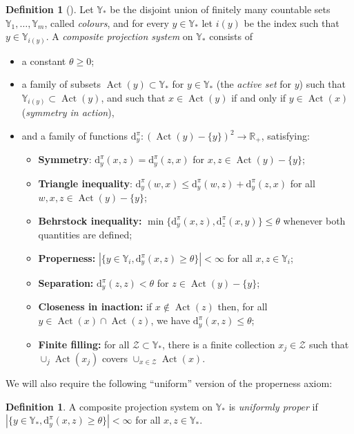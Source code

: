 \documentclass[svgnames]{amsart}
\theoremstyle{plain}
\theoremstyle{definition}
\newtheorem{defn}[thm]{Definition}
\newcommand{\R}{\mathbb{R}}
\newcommand{\dist}{\mathrm{d}}
\newcommand{\Act}{\operatorname{Act}}
\begin{document}
\begin{defn}[{\cite[Definition 1.2]{dahmani:rotating}}]\label{def;CPS}
Let $\mathbb{Y}_*$ be the disjoint union of finitely many countable sets $\mathbb{Y}_1, \dots, \mathbb{Y}_m$, called \emph{colours}, and for every $y\in \mathbb{Y}_*$ let $i(y)$ be the index such that $y\in \mathbb{Y}_{i(y)}$. A \emph{composite projection system} on $\mathbb{Y}_*$ consists of
\begin{itemize} 
\item a constant $\theta\ge 0$;
    \item a family of subsets  $\Act(y)\subset   \mathbb{Y}_*$ for $ y\in\mathbb{Y}_*$  (the \emph{active set} for $y$) such that $\mathbb{Y}_{i(y)} \subset\Act(y)$, and such that  $x\in \Act(y)$ if and only if $y\in \Act(x)$  (\emph{symmetry in action}), 
    \item and a family of functions $\dist^\pi_y : ( \Act(y)- \{y\} )^2 \to \R_+$, satisfying: 
    \begin{itemize} 
        \item \textbf{Symmetry}: $\dist^\pi_y(x,z)=\dist^\pi_y(z,x)$ for $x,z\in\Act(y)-\{y\}$;
        \item \textbf{Triangle inequality}: $\dist^\pi_y(w,x)\leq \dist^\pi_y(w,z)+\dist^\pi_y(z,x)$ for all $w,x,z\in\Act(y)-\{y\}$;
        \item \textbf{Behrstock inequality:} $\min\{\dist^\pi_y(x,z),\dist^\pi_z(x,y)\}\leq\theta$ whenever both quantities are defined; 
        \item \textbf{Properness:} $|\{y \in \mathbb{Y}_i, \dist^\pi_y(x,z)\geq \theta \}|<\infty$ for all $x,z\in \mathbb{Y}_i$;
			\item  \textbf{Separation:} $\dist^\pi_y(z,z)<\theta$ for $z\in\Act(y)-\{y\}$;
			\item  \textbf{Closeness in inaction:} if   $x\notin \Act(z)$ then, for
			all $y \in \Act(x) \cap \Act(z)$, we have $ \dist_y^\pi(x, z)\leq \theta$; 
			\item \textbf{Finite filling:}  for all $\mathcal{Z}\subset \mathbb{Y}_*$, there
			is a finite collection $x_j\in\mathcal{Z}$ such that $\cup_j
			\Act(x_j)$ covers  $\cup_{ x\in \mathcal{Z}} \Act(x)$.
		\end{itemize}
	\end{itemize}
\end{defn}

We will also require the following “uniform” version of the properness axiom:
\begin{defn}\label{defn:uniform_properness_CPS}
    A composite projection system on $\mathbb{Y}_*$ is \emph{uniformly proper} if $|\{y \in \mathbb{Y}_*, \dist^\pi_y(x,z)\geq \theta \}|<\infty$ for all $x,z\in \mathbb{Y}_*$.
\end{defn}
\end{document}
